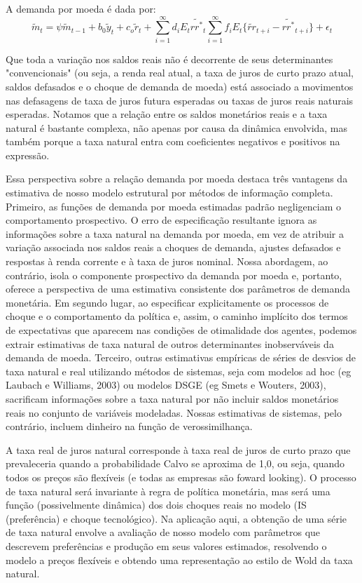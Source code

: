 A demanda por moeda é dada por:
$$\tilde{m}_t = \psi\tilde{m}_{t-1} + b_0 \tilde{y}_t + c_o \tilde{r}_t + \sum_{i=1}^{\infty} d_i E_t \tilde{rr^{*}}_t  \sum_{i=1}^{\infty} f_i E_t \{\tilde{rr}_{t+i} - \tilde{rr^{*}}_{t+i}  \} + \epsilon_t $$

Que toda a variação nos saldos reais não é decorrente de seus determinantes "convencionais" (ou seja, a renda real atual, a
taxa de juros de curto prazo atual, saldos defasados e o choque de demanda de moeda) está associado a movimentos nas defasagens de taxa de juros futura esperadas ou taxas de juros reais naturais esperadas. Notamos que a relação entre os saldos monetários reais e a taxa natural é bastante complexa, não apenas por causa da dinâmica envolvida, mas também porque a taxa natural entra com coeficientes negativos e positivos na expressão.

Essa perspectiva sobre a relação demanda por moeda destaca três vantagens da estimativa de nosso modelo estrutural por métodos de informação completa. Primeiro, as funções de demanda por moeda estimadas padrão negligenciam o comportamento prospectivo. O erro de especificação resultante ignora as informações sobre a taxa natural na demanda por moeda, em vez de atribuir a variação associada nos saldos reais a choques de demanda, ajustes defasados e respostas à renda corrente e à taxa de juros nominal. Nossa abordagem, ao contrário, isola o componente prospectivo da demanda por moeda e, portanto, oferece a perspectiva de uma estimativa consistente dos parâmetros de demanda monetária. Em segundo lugar, ao especificar explicitamente os processos de choque e o comportamento da política e, assim, o caminho implícito dos termos de expectativas que aparecem nas condições de otimalidade dos agentes, podemos extrair estimativas de taxa natural de outros determinantes inobserváveis da demanda de moeda. Terceiro, outras estimativas empíricas de séries de desvios de taxa natural e real utilizando métodos de sistemas, seja com modelos ad hoc (eg Laubach e Williams, 2003) ou modelos DSGE (eg Smets e Wouters, 2003), sacrificam informações sobre a taxa natural por não incluir saldos monetários reais no conjunto de variáveis modeladas. Nossas estimativas de sistemas, pelo contrário, incluem dinheiro na função de verossimilhança.

A taxa real de juros natural corresponde à taxa real de juros de curto prazo que prevaleceria quando a probabilidade Calvo se aproxima de 1,0, ou seja, quando todos os preços são flexíveis (e todas as empresas são foward looking). O processo de taxa natural será invariante à regra de política monetária, mas será uma função (possivelmente dinâmica) dos dois choques reais no modelo (IS (preferência) e choque tecnológico). Na aplicação aqui, a obtenção de uma série de taxa natural envolve a avaliação de nosso modelo com parâmetros que descrevem preferências e produção em seus valores estimados, resolvendo o modelo a preços flexíveis e obtendo uma representação ao estilo de Wold da taxa natural.

